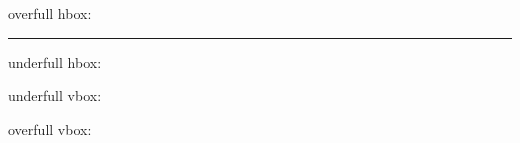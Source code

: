 \documentclass{article}
\begin{document}
overfull hbox:

\rule{2\textwidth}{2pt}

\bigskip

\clearpage

underfull hbox:

\fbox{\parbox{6cm}{%
\rule{5cm}{2pt}
\rule{5cm}{8pt}
}}

\clearpage

underfull vbox:



\clearpage

overfull vbox:

\fbox{\parbox[c][3cm][s]{4cm}{\rule{2pt}{5cm}}}
\end{document}
